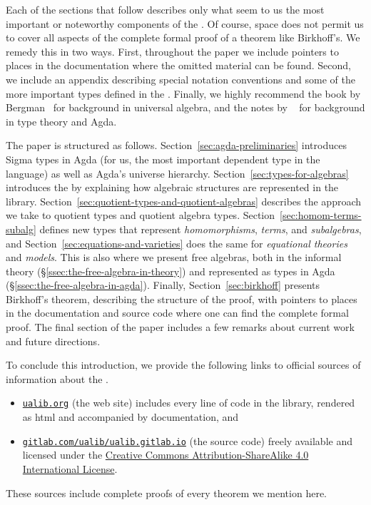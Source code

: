 Each of the sections that follow describes only what seem to us the most important or noteworthy components of the \ualib. Of course, space does not permit us to cover all aspects of the complete formal proof of a theorem like Birkhoff's.  We remedy this in two ways. First, throughout the paper we include pointers to places in the documentation where the omitted material can be found.  Second, we include an appendix describing special notation conventions and some of the more important types defined in the \ualib.  Finally, we highly recommend the book by Bergman~\cite{Bergman:2012} for background in universal algebra, and the notes by \escardo~\cite{MHE} for background in type theory and Agda.

The paper is structured as follows. Section~\ref{sec:agda-preliminaries} introduces Sigma types in Agda (for us, the most important dependent type in the language) as well as Agda's universe hierarchy. Section~\ref{sec:types-for-algebras} introduces the \agdaualib by explaining how algebraic structures are represented in the library. Section~\ref{sec:quotient-types-and-quotient-algebras} describes the approach we take to quotient types and quotient algebra types. Section~\ref{sec:homom-terms-subalg} defines new types that represent \emph{homomorphisms}, \emph{terms}, and \emph{subalgebras}, and Section~\ref{sec:equations-and-varieties} does the same for \emph{equational theories} and \emph{models}. This is also where we present free algebras, both in the informal theory (\S\ref{ssec:the-free-algebra-in-theory}) and represented as types in Agda (\S\ref{ssec:the-free-algebra-in-agda}). Finally, Section~\ref{sec:birkhoff} presents Birkhoff's theorem, describing the structure of the proof, with pointers to places in the documentation and source code where one can find the complete formal proof. The final section of the paper includes a few remarks about current work and future directions.

To conclude this introduction, we provide the following links to official sources of information about the \agdaualib.
\begin{itemize}
  \item \href{https://ualib.gitlab.io}{\texttt{ualib.org}} (the web site) includes every line of code in the library, rendered as html and accompanied by documentation, and
  \item \href{https://gitlab.com/ualib/ualib.gitlab.io}{\texttt{gitlab.com/ualib/ualib.gitlab.io}} (the source code) freely available and licensed under the \href{https://creativecommons.org/licenses/by-sa/4.0/}{Creative Commons Attribution-ShareAlike 4.0 International License}.
\end{itemize}
These sources include complete proofs of every theorem we mention here.
